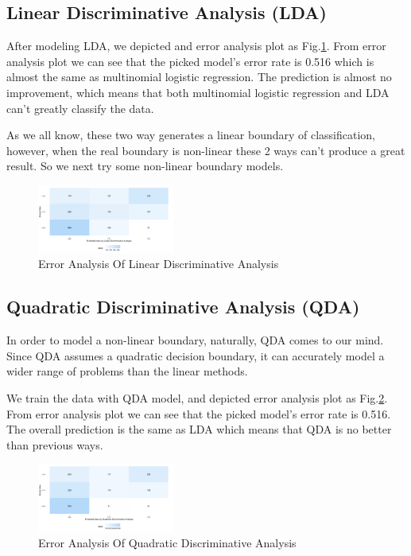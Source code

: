 \documentclass[conference]{IEEEtran}
\begin{document}
\subsection{Linear Discriminative Analysis (LDA)}
After modeling LDA, we depicted and error analysis plot as Fig.\ref{errorLinearDiscriminativeAnalysis.pdf}. From error analysis plot we can see that the picked model's error rate is 0.516 which is almost the same as multinomial logistic regression. The prediction is almost no improvement, which means that both multinomial logistic regression and LDA can't greatly classify the data. 

As we all know, these two way generates a linear boundary of classification, however, when the real boundary is non-linear these 2 ways can't produce a great result. So we next try some non-linear boundary models.

\begin{figure}[htbp]
\centerline{\includegraphics[width=0.4\textwidth]{figure/errorLinearDiscriminativeAnalysis.png}}
\caption{Error Analysis Of Linear Discriminative Analysis}
\label{errorLinearDiscriminativeAnalysis.pdf}
\end{figure}


\subsection{Quadratic Discriminative Analysis (QDA)}
In order to model a non-linear boundary, naturally, QDA comes to our mind. Since QDA assumes a quadratic decision boundary, it can accurately model a wider range of problems than the linear methods. 

We train the data with QDA model, and depicted error analysis plot as Fig.\ref{errorQuadraticDiscriminativeAnalysis.pdf}. From error analysis plot we can see that the picked model's error rate is 0.516. The overall prediction is the same as LDA which means that QDA is no better than previous ways. 


\begin{figure}[htbp]
\centerline{\includegraphics[width=0.4\textwidth]{figure/errorQuadraticDiscriminativeAnalysis.png}}
\caption{Error Analysis Of Quadratic Discriminative Analysis}
\label{errorQuadraticDiscriminativeAnalysis.pdf}
\end{figure}
\end{document}
